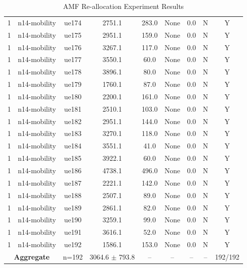 \begin{table}[ht]
\begin{tabular}{|c|c|c|c|c|c|c|c|c|}
1 & n14-mobility & ue174 & 2751.1 & 283.0 & None & 0.0 & N & Y \\
1 & n14-mobility & ue175 & 2951.1 & 159.0 & None & 0.0 & N & Y \\
1 & n14-mobility & ue176 & 3267.1 & 117.0 & None & 0.0 & N & Y \\
1 & n14-mobility & ue177 & 3550.1 & 60.0 & None & 0.0 & N & Y \\
1 & n14-mobility & ue178 & 3896.1 & 80.0 & None & 0.0 & N & Y \\
1 & n14-mobility & ue179 & 1760.1 & 87.0 & None & 0.0 & N & Y \\
1 & n14-mobility & ue180 & 2200.1 & 161.0 & None & 0.0 & N & Y \\
1 & n14-mobility & ue181 & 2510.1 & 103.0 & None & 0.0 & N & Y \\
1 & n14-mobility & ue182 & 2951.1 & 144.0 & None & 0.0 & N & Y \\
1 & n14-mobility & ue183 & 3270.1 & 118.0 & None & 0.0 & N & Y \\
1 & n14-mobility & ue184 & 3551.1 & 41.0 & None & 0.0 & N & Y \\
1 & n14-mobility & ue185 & 3922.1 & 60.0 & None & 0.0 & N & Y \\
1 & n14-mobility & ue186 & 4738.1 & 496.0 & None & 0.0 & N & Y \\
1 & n14-mobility & ue187 & 2221.1 & 142.0 & None & 0.0 & N & Y \\
1 & n14-mobility & ue188 & 2507.1 & 89.0 & None & 0.0 & N & Y \\
1 & n14-mobility & ue189 & 2861.1 & 82.0 & None & 0.0 & N & Y \\
1 & n14-mobility & ue190 & 3259.1 & 99.0 & None & 0.0 & N & Y \\
1 & n14-mobility & ue191 & 3616.1 & 52.0 & None & 0.0 & N & Y \\
1 & n14-mobility & ue192 & 1586.1 & 153.0 & None & 0.0 & N & Y \\
\multicolumn{2}{|c|}{\textbf{Aggregate}} & n=192 & 3064.6 $\pm$ 793.8 & -- & -- & -- & -- & 192/192 \\
\hline
\end{tabular}
\caption{AMF Re-allocation Experiment Results}
\label{tab:amf_realloc}
\end{table}
